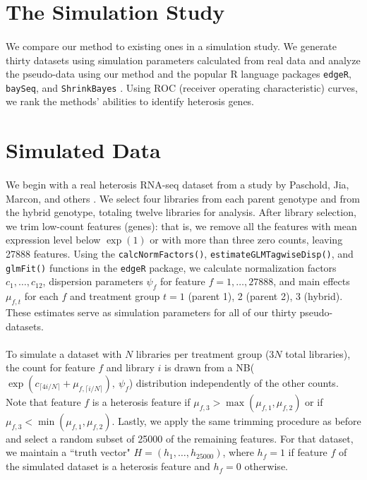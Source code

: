 \documentclass{article}
\begin{document}
\begin{flushleft}


\section{The Simulation Study}

\paragraph{} We compare our method to existing ones in a simulation study. We generate thirty datasets using simulation parameters calculated from real data and analyze the pseudo-data using our method and the popular R language packages {\tt edgeR}, {\tt baySeq}, and {\tt ShrinkBayes} \cite{cran} \cite{bioconductor}. Using ROC (receiver operating characteristic) curves, we rank the methods' abilities to identify heterosis genes.

\section{Simulated Data}

\paragraph{} We begin with a real heterosis RNA-seq dataset from a study by Paschold, Jia, Marcon, and others \cite{paschold}. We select four libraries from each parent genotype and from the hybrid genotype, totaling twelve libraries for analysis. After library selection, we trim low-count features (genes): that is, we remove all the features with mean expression level below $\exp(1)$ or with more than three zero counts, leaving 27888 features. Using the {\tt calcNormFactors()}, {\tt estimateGLMTagwiseDisp()}, and {\tt glmFit()} functions in the {\tt edgeR} package, we calculate normalization factors $c_1, \ldots, c_{12}$, dispersion parameters $\psi_{f}$ for feature $f = 1, \ldots, 27888$, and main effects $\mu_{f, t}$ for each $f$ and treatment group $t = 1$ (parent 1), 2 (parent 2), 3 (hybrid). These estimates serve as simulation parameters for all of our thirty pseudo-datasets.

\paragraph{} To simulate a dataset with $N$ libraries per treatment group ($3N$ total libraries), the count for feature $f$ and library $i$ is drawn from a NB($\exp(c_{\lceil 4i/N \rceil} + \mu_{f, \lceil i/N \rceil}), \ \psi_f$) distribution independently of the other counts. Note that feature $f$ is a heterosis feature if $\mu_{f, 3} > \max(\mu_{f, 1}, \mu_{f, 2})$ or if $\mu_{f, 3} < \min(\mu_{f, 1}, \mu_{f, 2})$. Lastly, we apply the same trimming procedure as before and select a random subset of 25000 of the remaining features. For that dataset, we maintain a ``truth vector" $H = (h_1, \ldots, h_{25000})$, where $h_f = 1$ if feature $f$ of the simulated dataset is a heterosis feature and $h_f = 0$ otherwise.


\end{flushleft}
\end{document}
